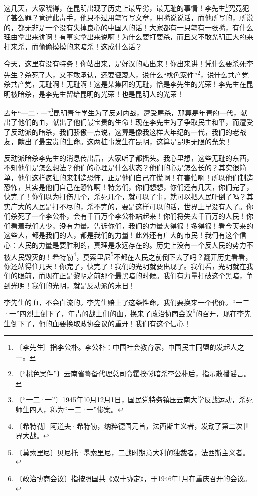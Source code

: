 \documentclass[12pt,UTF-8,openany]{ctexbook}
\begin{document}
\begin{normalsize}
    
    这几天，大家晓得，在昆明出现了历史上最卑劣，最无耻的事情！李先生\footnote{〔李先生〕指李公朴。李公朴：中国社会教育家，中国民主同盟的发起人之一。}究竟犯了甚么罪？竟遭此毒手，他只不过用笔写写文章，用嘴说说话，而他所写的，所说的，都无非是一个没有失掉良心的中国人的话！大家都有一只笔有一张嘴，有什么理由拿出来讲啊！有事实拿出来说啊！为什么要打要杀，而且又不敢光明正大的来打来杀，而偷偷摸摸的来暗杀！这成什么话？
    
    今天，这里有没有特务！你站出来，是好汉的站出来！你出来讲！凭什么要杀死李先生？杀死了人，又不敢承认，还要诬蔑人，说什么“桃色案件”\footnote{〔“桃色案件”〕云南省警备代理总司令霍揆彰暗杀李公朴后，指示散播谣言。}，说什么共产党杀共产党，无耻啊！无耻啊！这是某集团的无耻，恰是李先生的光荣！李先生在昆明被暗杀，是李先生留给昆明的光荣！也是昆明人的光荣！
    
    去年“一二·一”\footnote{〔“一二·一”〕1945年10月12月1日，国民党特务镇压云南大学反战运动，杀死师生四人，称为“一二·一”惨案。}昆明青年学生为了反对内战，遭受屠杀，那算是年青的一代，献出了他们的血，献出了他们最宝贵的生命！现在李先生为了争取民主和平，而遭受了反动派的暗杀，我们骄傲一点说，这算是像我这样大年纪的一代，我们的老战友，献出了最宝贵的生命。这两桩事发生在昆明，这算是昆明无限的光荣！
    
    反动派暗杀李先生的消息传出后，大家听了都摇头。我心里想，这些无耻的东西，不知他们是怎么想法？他们的心理是什么状态？他们的心是怎么长的？其实很简单，他们这样疯狂的来制造恐怖，正是他们自己在慌啊！在害怕啊！所以他们制造恐怖，其实是他们自己在恐怖啊！特务们，你们想想，你们还有几天，你们完了，快完了！你们以为打伤几个，杀死几个，就可以了事，就可以把人民吓倒了吗？其实广大的人民是打不尽的，杀不完的，要是这样可以的话，世界上早没有人了。你们杀死了一个李公朴，会有千百万个李公朴站起来！你们将失去千百万的人民！你们看着我们人少，没有力量。告诉你们，我们的力量大得很！多得很！看今天来的这些人，都是我们的人，都是我们的力量！此外还有广大的市民！我们有这个信心：人民的力量是要胜利的，真理是永远存在的。历史上没有一个反人民的势力不被人民毁灭的！希特勒\footnote{〔希特勒〕阿道夫·希特勒，纳粹德国元首，法西斯主义者，发动了第二次世界大战。}，莫索里尼\footnote{〔莫索里尼〕贝尼托·墨索里尼，二战时期意大利的独裁者，法西斯主义者。}不都在人民之前倒下去了吗？翻开历史看看，你还站得住几天！你完了，快完了！我们的光明就要出现了。我们看，光明就在我们的眼前，而现在正是黎明之前那个最黑暗的时候。我们有力量打破这个黑暗，争到光明！我们的光明，就是反动派的末日！
    
    李先生的血，不会白流的。李先生赔上了这条性命，我们要换来一个代价。“一二·一”四烈士倒下了，年青的战士们的血，换来了政治协商会议\footnote{〔政治协商会议〕指按照国共《双十协定》，于1946年1月在重庆召开的会议。}的召开，现在李先生倒下了，他的血要换取政协会议的重开！我们有这个信心！
    

\end{normalsize}
\end{document}
